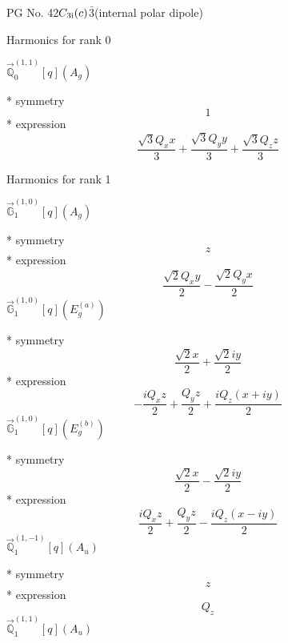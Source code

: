 \documentclass[fleqn,8pt]{jsarticle}
\begin{document}
\setcounter{MaxMatrixCols}{32}

\renewcommand{\tablename}{Table~}
\renewcommand{\figurename}{Figure~}
\begin{center}
\LARGE
PG No. 42\quad$C_{\rm 3i}(c)$\quad$\bar{3}$\quad[ trigonal ] (internal polar dipole)
\end{center}

\noindent * Harmonics for rank 0

\noindent\quad $\vec{\mathbb{Q}}_{0}^{(1,1)}[q](A_{g})$

\noindent\quad ** symmetry
\begin{dmath*}
1
\end{dmath*}
\noindent\quad ** expression
\begin{dmath*}
\frac{\sqrt{3} Q_{x} x}{3} + \frac{\sqrt{3} Q_{y} y}{3} + \frac{\sqrt{3} Q_{z} z}{3}
\end{dmath*}

\noindent * Harmonics for rank 1

\noindent\quad $\vec{\mathbb{G}}_{1}^{(1,0)}[q](A_{g})$

\noindent\quad ** symmetry
\begin{dmath*}
z
\end{dmath*}
\noindent\quad ** expression
\begin{dmath*}
\frac{\sqrt{2} Q_{x} y}{2} - \frac{\sqrt{2} Q_{y} x}{2}
\end{dmath*}
\noindent\quad $\vec{\mathbb{G}}_{1}^{(1,0)}[q](E_{g}^{(a)})$

\noindent\quad ** symmetry
\begin{dmath*}
\frac{\sqrt{2} x}{2} + \frac{\sqrt{2} i y}{2}
\end{dmath*}
\noindent\quad ** expression
\begin{dmath*}
- \frac{i Q_{x} z}{2} + \frac{Q_{y} z}{2} + \frac{i Q_{z} \left(x + i y\right)}{2}
\end{dmath*}
\noindent\quad $\vec{\mathbb{G}}_{1}^{(1,0)}[q](E_{g}^{(b)})$

\noindent\quad ** symmetry
\begin{dmath*}
\frac{\sqrt{2} x}{2} - \frac{\sqrt{2} i y}{2}
\end{dmath*}
\noindent\quad ** expression
\begin{dmath*}
\frac{i Q_{x} z}{2} + \frac{Q_{y} z}{2} - \frac{i Q_{z} \left(x - i y\right)}{2}
\end{dmath*}
\noindent\quad $\vec{\mathbb{Q}}_{1}^{(1,-1)}[q](A_{u})$

\noindent\quad ** symmetry
\begin{dmath*}
z
\end{dmath*}
\noindent\quad ** expression
\begin{dmath*}
Q_{z}
\end{dmath*}
\noindent\quad $\vec{\mathbb{Q}}_{1}^{(1,1)}[q](A_{u})$
\end{document}
